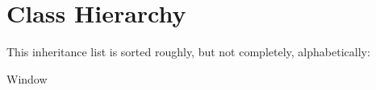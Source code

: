 \section{Class Hierarchy}
This inheritance list is sorted roughly, but not completely, alphabetically\+:\begin{DoxyCompactList}
\item Window\begin{DoxyCompactList}
\item {}
\end{DoxyCompactList}
\end{DoxyCompactList}
